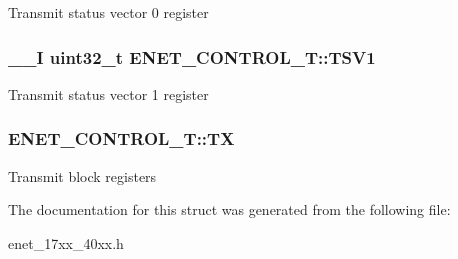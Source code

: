 Transmit status vector 0 register \hypertarget{struct_e_n_e_t___c_o_n_t_r_o_l___t_a03b03ad79457f3f25cc3d1d2d564310a}{
\subsubsection[{T\+S\+V1}]{\setlength{\rightskip}{0pt plus 5cm}\+\_\+\+\_\+\+I uint32\+\_\+t E\+N\+E\+T\+\_\+\+C\+O\+N\+T\+R\+O\+L\+\_\+\+T\+::\+T\+S\+V1}}\label{struct_e_n_e_t___c_o_n_t_r_o_l___t_a03b03ad79457f3f25cc3d1d2d564310a}
Transmit status vector 1 register \hypertarget{struct_e_n_e_t___c_o_n_t_r_o_l___t_a1010eaf24cd6af0d6355b4cd34d8e90a}{
\subsubsection[{T\+X}]{ E\+N\+E\+T\+\_\+\+C\+O\+N\+T\+R\+O\+L\+\_\+\+T\+::\+T\+X}}\label{struct_e_n_e_t___c_o_n_t_r_o_l___t_a1010eaf24cd6af0d6355b4cd34d8e90a}
Transmit block registers 

The documentation for this struct was generated from the following file\+:\begin{DoxyCompactItemize}
\item 
enet\+\_\+17xx\+\_\+40xx.\+h\end{DoxyCompactItemize}
